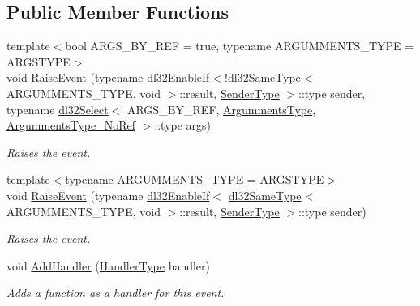 \subsection*{Public Member Functions}
\begin{DoxyCompactItemize}
\item 
{\footnotesize template$<$bool A\-R\-G\-S\-\_\-\-B\-Y\-\_\-\-R\-E\-F = true, typename A\-R\-G\-U\-M\-M\-E\-N\-T\-S\-\_\-\-T\-Y\-P\-E  = A\-R\-G\-S\-T\-Y\-P\-E$>$ }\\void \hyperlink{classdl32_event_a390017b71d6d9b42d4faa82262d2658d}{Raise\-Event} (typename \hyperlink{structdl32_enable_if}{dl32\-Enable\-If}$<$!\hyperlink{classdl32_same_type}{dl32\-Same\-Type}$<$ A\-R\-G\-U\-M\-M\-E\-N\-T\-S\-\_\-\-T\-Y\-P\-E, void $>$\-::result, \hyperlink{classdl32_event_a9117f53a76ba65e2bd3e81b4e284fc99}{Sender\-Type} $>$\-::type sender, typename \hyperlink{classdl32_select}{dl32\-Select}$<$ A\-R\-G\-S\-\_\-\-B\-Y\-\_\-\-R\-E\-F, \hyperlink{classdl32_event_aa538fe87567988f01835e94ab65ddfaa}{Argumments\-Type}, \hyperlink{classdl32_event_acfe0f352d4d5797e1d6371ea326bfcc3}{Argumments\-Type\-\_\-\-No\-Ref} $>$\-::type args)
\begin{DoxyCompactList}\small\item\em Raises the event. \end{DoxyCompactList}\item 
{\footnotesize template$<$typename A\-R\-G\-U\-M\-M\-E\-N\-T\-S\-\_\-\-T\-Y\-P\-E  = A\-R\-G\-S\-T\-Y\-P\-E$>$ }\\void \hyperlink{classdl32_event_aa65cceb7ad1fb6f46c23a0753ed85205}{Raise\-Event} (typename \hyperlink{structdl32_enable_if}{dl32\-Enable\-If}$<$ \hyperlink{classdl32_same_type}{dl32\-Same\-Type}$<$ A\-R\-G\-U\-M\-M\-E\-N\-T\-S\-\_\-\-T\-Y\-P\-E, void $>$\-::result, \hyperlink{classdl32_event_a9117f53a76ba65e2bd3e81b4e284fc99}{Sender\-Type} $>$\-::type sender)
\begin{DoxyCompactList}\small\item\em Raises the event. \end{DoxyCompactList}\item 
void \hyperlink{classdl32_event_a35ad65c92e6f9f042f75026b8a65155c}{Add\-Handler} (\hyperlink{classdl32_event_a38bb65a0ecb861ef8cf99cc22bf2b393}{Handler\-Type} handler)
\begin{DoxyCompactList}\small\item\em Adds a function as a handler for this event. \end{DoxyCompactList}\item 

\end{DoxyCompactItemize}
